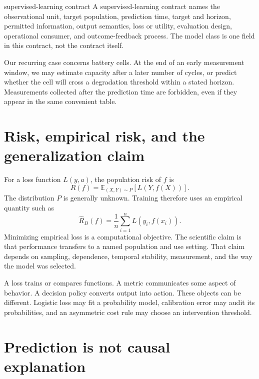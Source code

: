 \begin{definitionbox}{supervised-learning contract}
A supervised-learning contract names the observational unit, target population,
prediction time, target and horizon, permitted information, output semantics,
loss or utility, evaluation design, operational consumer, and outcome-feedback
process. The model class is one field in this contract, not the contract itself.
\end{definitionbox}

Our recurring case concerns battery cells. At the end of an early measurement
window, we may estimate capacity after a later number of cycles, or predict
whether the cell will cross a degradation threshold within a stated horizon.
Measurements collected after the prediction time are forbidden, even if they
appear in the same convenient table.

\section{Risk, empirical risk, and the generalization claim}

For a loss function $L(y,a)$, the population risk of $f$ is
\[
R(f)=\mathbb{E}_{(X,Y)\sim P}[L(Y,f(X))].
\]
The distribution $P$ is generally unknown. Training therefore uses an empirical
quantity such as
\[
\widehat R_D(f)=\frac{1}{n}\sum_{i=1}^n L(y_i,f(x_i)).
\]
Minimizing empirical loss is a computational objective. The scientific claim
is that performance transfers to a named population and use setting. That claim
depends on sampling, dependence, temporal stability, measurement, and the way
the model was selected.

A loss trains or compares functions. A metric communicates some aspect of
behavior. A decision policy converts output into action. These objects can be
different. Logistic loss may fit a probability model, calibration error may
audit its probabilities, and an asymmetric cost rule may choose an intervention
threshold.


\section{Prediction is not causal explanation}

